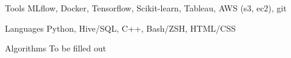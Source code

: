 

\begin{cvskills}

  \cvskill
    {Tools} %
    {MLflow, Docker, Tensorflow, Scikit-learn, Tableau, AWS (s3, ec2), git} %

  \cvskill
    {Languages} %
    {Python, Hive/SQL, C++, Bash/ZSH, HTML/CSS} %

  \cvskill
    {Algorithms} %
    {To be filled out} %


\end{cvskills}
